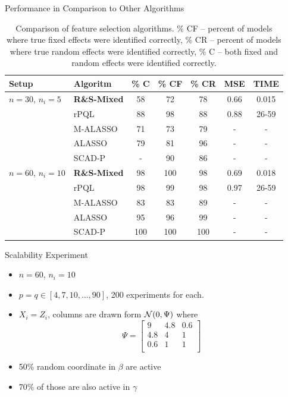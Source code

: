 \documentclass[8pt]{beamer}
\newcommand{\ouralgo}{R\&S-Mixed }
\begin{document}
\begin{frame}{Performance in Comparison to Other Algorithms}
\begin{table}[H]
\begin{center}
\begin{tabular}{|l|l|c|c|c|c|c|}
\hline
Setup & Algoritm & \% C & \% CF & \% CR & MSE & TIME \\
\hline 
\hline
$n = 30$, $n_i = 5$ & \textbf{\ouralgo} & 58 & 72 & 78 & 0.66 & 0.015 \\
& rPQL & 88 & 98 & 88 & 0.88 & 26-59 \\ 
& M-ALASSO & 71 & 73 & 79 & - & -\\
& ALASSO & 79 & 81 & 96 & - & - \\
& SCAD-P & - & 90 & 86 & - & - \\
\hline 
$n = 60$, $n_i = 10$ & \textbf{\ouralgo} & 98 & 100  & 98 & 0.69& 0.018 \\
& rPQL & 98 & 99 & 98 & 0.97 &  26-59 \\ 
& M-ALASSO & 83 & 83 & 89 & - & - \\
& ALASSO & 95 & 96 & 99 & - & -\\
& SCAD-P & 100 & 100 & 100 & - & - \\
\hline
	
\end{tabular}
\end{center}
\caption{\label{table:krishna_setup_results} Comparison of feature selection algorithms. \% CF -- percent of models where true fixed effects were identified correctly, \% CR -- percent of models where true random effects were identified correctly, \% C -- both fixed and random effects were identified correctly.}	
\end{table}
	
\end{frame}

\begin{frame}{Scalability Experiment}
\begin{itemize}
	\item $n = 60$, $n_i = 10$
	\item $p = q \in [4, 7, 10, \dots, 90]$, 200 experiments for each.
	\item $X_i = Z_i$, columns are drawn form $\operatorname{\mathcal{N}}(0, \Psi)$ where
	\[
		\Psi = \begin{bmatrix}
			9 & 4.8 & 0.6 \\
			4.8 & 4 & 1 \\
			0.6 & 1 & 1 \\
		\end{bmatrix}
	\]
	\item 50\% random coordinate in $\beta$ are active
	\item 70\% of those are also active in $\gamma$
\end{itemize}
\end{frame}
\end{document}
